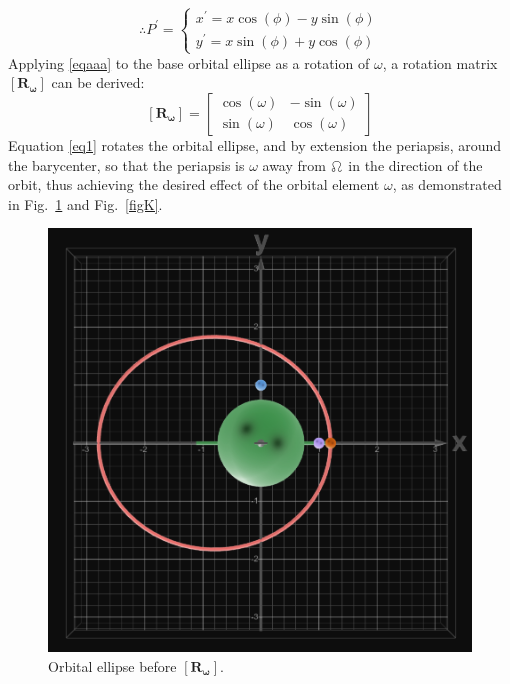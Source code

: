 \documentclass[conference]{IEEEtran}
\begin{document}
			\begin{equation}
				\therefore P^\prime=
				\begin{cases}
					x^\prime=x\cos{\left(\phi\right)}-y\sin{\left(\phi\right)}\\
					y^\prime=x\sin{\left(\phi\right)}+y\cos{\left(\phi\right)}
				\end{cases}
				\label{eqaaa}
			\end{equation}
			Applying \eqref{eqaaa} to the base orbital ellipse as a rotation of \( \omega \), a rotation matrix \( \bm{\left[R_{\omega}\right]} \) can be derived:
			\begin{equation}
				\bm{\left[R_{\omega}\right]}=
				\begin{bmatrix}
					\cos{\left(\omega\right)} & -\sin{\left(\omega\right)}\\
					\sin{\left(\omega\right)} & \cos{\left(\omega\right)}
				\end{bmatrix}
				\label{eq1}
			\end{equation}
			Equation \eqref{eq1} rotates the orbital ellipse, and by extension the periapsis, around the barycenter, so that the periapsis is \( \omega \) away from \( \ascnode \) in the direction of the orbit, thus achieving the desired effect of the orbital element \( \omega \), as demonstrated in Fig.~\ref{figJ} and Fig.~\ref{figK}.

			\begin{figure}[hbtp]
				\begin{center}
					\includegraphics[width=0.8\columnwidth]{1.png}
				\end{center}
				\caption{Orbital ellipse before \( \bm{\left[R_{\omega}\right]} \).}
				\label{figJ}
			\end{figure}
\end{document}
